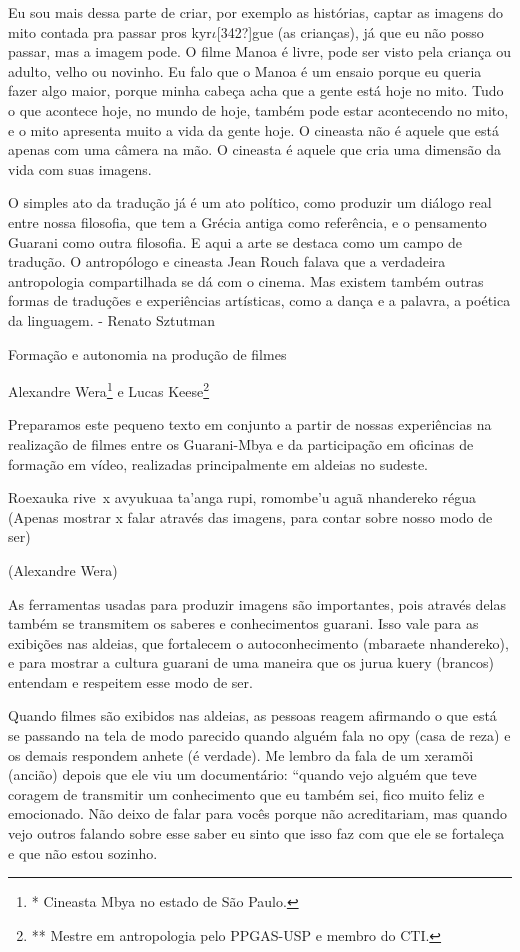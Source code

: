 \documentclass{article}
\begin{document}
Eu sou mais dessa parte de criar, por exemplo as hist\'orias, captar as
imagens do mito contada pra passar pros kyr$\iota $[342?]gue (as
crian\c{c}as), j\'a que eu n\~ao posso passar, mas a imagem pode. O
filme Manoa \'e livre, pode ser visto pela crian\c{c}a ou adulto, velho
ou novinho. Eu falo que o Manoa \'e um ensaio porque eu queria fazer
algo maior, porque minha cabe\c{c}a acha que a gente est\'a hoje no
mito. Tudo o que acontece hoje, no mundo de hoje, tamb\'em pode estar
acontecendo no mito, e o mito apresenta muito a vida da gente hoje. O
cineasta n\~ao \'e aquele que est\'a apenas com uma c\^amera na m\~ao.
O cineasta \'e aquele que cria uma dimens\~ao da vida com suas imagens.

O simples ato da tradu\c{c}\~ao j\'a \'e um ato pol\'itico, como
produzir um di\'alogo real entre nossa filosofia, que tem a Gr\'ecia
antiga como refer\^encia, e o pensamento Guarani como outra filosofia.
E aqui a arte se destaca como um campo de tradu\c{c}\~ao. O
antrop\'ologo e cineasta Jean Rouch falava que a verdadeira
antropologia compartilhada se d\'a com o cinema. Mas existem tamb\'em
outras formas de tradu\c{c}\~oes e experi\^encias art\'isticas, como a
dan\c{c}a e a palavra, a po\'etica da linguagem. - Renato Sztutman

Forma\c{c}\~ao e autonomia na produ\c{c}\~ao de filmes

Alexandre Wera\footnote{* Cineasta Mbya no estado de S\~ao Paulo.} e
Lucas Keese\footnote{** Mestre em antropologia pelo PPGAS-USP e membro
do CTI.} 

Preparamos este pequeno texto em conjunto a partir de nossas
experi\^encias na realiza\c{c}\~ao de filmes entre os Guarani-Mbya e da
participa\c{c}\~ao em oficinas de forma\c{c}\~ao em v\'ideo, realizadas
principalmente em aldeias no sudeste.

Roexauka rive~x avyukuaa ta{\textquoteright}anga rupi,
romombe{\textquoteright}u agu\~a nhandereko r\'egua (Apenas mostrar x
falar atrav\'es das imagens, para contar sobre nosso modo de ser)

(Alexandre Wera)

As ferramentas usadas para produzir imagens s\~ao importantes, pois
atrav\'es delas tamb\'em se transmitem os saberes e conhecimentos
guarani. Isso vale para as exibi\c{c}\~oes nas aldeias, que fortalecem
o autoconhecimento (mbaraete nhandereko), e para mostrar a cultura
guarani de uma maneira que os jurua kuery (brancos) entendam e
respeitem esse modo de ser.

Quando filmes s\~ao exibidos nas aldeias, as pessoas reagem afirmando o
que est\'a se passando na tela de modo parecido quando algu\'em fala no
opy (casa de reza) e os demais respondem anhete (\'e verdade). Me
lembro da fala de um xeram\~oi (anci\~ao) depois que ele viu um
document\'ario: {\textquotedblleft}quando vejo algu\'em que teve
coragem de transmitir um conhecimento que eu tamb\'em sei, fico muito
feliz e emocionado. N\~ao deixo de falar para voc\^es porque n\~ao
acreditariam, mas quando vejo outros falando sobre esse saber eu sinto
que isso faz com que ele se fortale\c{c}a e que n\~ao estou
sozinho.{\textquotedbl}
\end{document}
